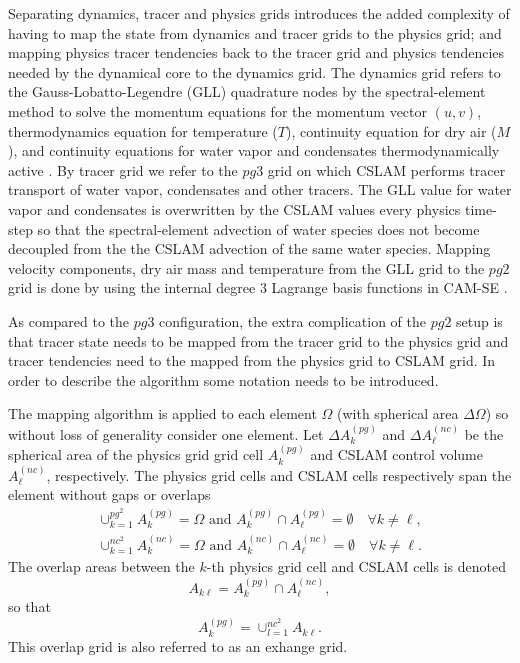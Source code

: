 Separating dynamics, tracer and physics grids introduces the added complexity of having to map the state from dynamics and tracer grids to the physics grid; and mapping physics tracer tendencies back to the tracer grid and physics tendencies needed by the dynamical core to the dynamics grid. The dynamics grid refers to the Gauss-Lobatto-Legendre (GLL) quadrature nodes by the spectral-element method to solve the momentum equations for the momentum vector $(u,v)$, thermodynamics equation for temperature ($T$), continuity equation for dry air ($M$), and continuity equations for water vapor and condensates thermodynamically active \citep[see, e.g., ][ for details]{LetAl2018JAMES}. By tracer grid we refer to the $pg3$ grid on which CSLAM performs tracer transport of water vapor, condensates and other tracers. The GLL value for water vapor and condensates is overwritten by the CSLAM values every physics time-step so that the spectral-element advection of water species does not become decoupled from the the CSLAM advection of the same water species. Mapping velocity components, dry air mass and temperature from the GLL grid to the $pg2$ grid is done by using the internal degree 3 Lagrange basis functions in CAM-SE \citep[ as described in  ][ for pg3; exactly the same methods can be used for $pg2$]{HL2018MWR}.

As compared to the $pg3$ configuration, the extra complication of the $pg2$ setup is that tracer state needs to be mapped from the tracer grid to the physics grid and tracer tendencies need to the mapped from the physics grid to CSLAM grid. In order to describe the algorithm some notation needs to be introduced.

The mapping algorithm is applied to each element $\Omega$ (with spherical area $\Delta \Omega$) so without loss of generality consider one element. Let $\Delta A^{(pg)}_k$ and $\Delta A^{(nc)}_\ell$ be the spherical area of the physics grid grid cell $A^{(pg)}_k$ and CSLAM control volume $A^{(nc)}_\ell$, respectively. The physics grid cells and CSLAM cells respectively span the element without gaps or overlaps
\begin{eqnarray}
\cup_{k=1}^{pg^2}A^{(pg)}_k=\Omega \text{ and } A^{(pg)}_k \cap A^{(pg)}_\ell = \emptyset \quad \forall k\ne \ell,\\
\cup_{k=1}^{nc^2}A^{(nc)}_k=\Omega \text{ and } A^{(nc)}_k \cap A^{(nc)}_\ell = \emptyset \quad \forall k\ne \ell.
\end{eqnarray}
The overlap areas between the $k$-th physics grid cell and CSLAM cells is denoted
\begin{equation}
A_{k\ell}=A^{(pg)}_k \cap A^{(nc)}_\ell,
\end{equation}
so that
\begin{equation}
A^{(pg)}_k=\cup_{l=1}^{nc^2}A_{k\ell}.
\end{equation}
This overlap grid is also referred to as an exhange grid.
